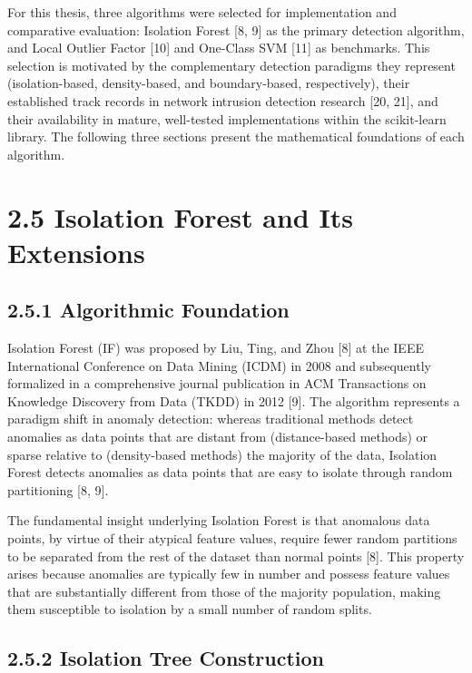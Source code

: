 \documentclass[
  a4paper]{report}
\begin{document}
For this thesis, three algorithms were selected for implementation and
comparative evaluation: Isolation Forest {[}8, 9{]} as the primary
detection algorithm, and Local Outlier Factor {[}10{]} and One-Class SVM
{[}11{]} as benchmarks. This selection is motivated by the complementary
detection paradigms they represent (isolation-based, density-based, and
boundary-based, respectively), their established track records in
network intrusion detection research {[}20, 21{]}, and their
availability in mature, well-tested implementations within the
scikit-learn library. The following three sections present the
mathematical foundations of each algorithm.

\section{2.5 Isolation Forest and Its
Extensions}\label{isolation-forest-and-its-extensions}

\subsection{2.5.1 Algorithmic Foundation}\label{algorithmic-foundation}

Isolation Forest (IF) was proposed by Liu, Ting, and Zhou {[}8{]} at the
IEEE International Conference on Data Mining (ICDM) in 2008 and
subsequently formalized in a comprehensive journal publication in ACM
Transactions on Knowledge Discovery from Data (TKDD) in 2012 {[}9{]}.
The algorithm represents a paradigm shift in anomaly detection: whereas
traditional methods detect anomalies as data points that are distant
from (distance-based methods) or sparse relative to (density-based
methods) the majority of the data, Isolation Forest detects anomalies as
data points that are easy to isolate through random partitioning {[}8,
9{]}.

The fundamental insight underlying Isolation Forest is that anomalous
data points, by virtue of their atypical feature values, require fewer
random partitions to be separated from the rest of the dataset than
normal points {[}8{]}. This property arises because anomalies are
typically few in number and possess feature values that are
substantially different from those of the majority population, making
them susceptible to isolation by a small number of random splits.

\subsection{2.5.2 Isolation Tree
Construction}\label{isolation-tree-construction}
\end{document}
